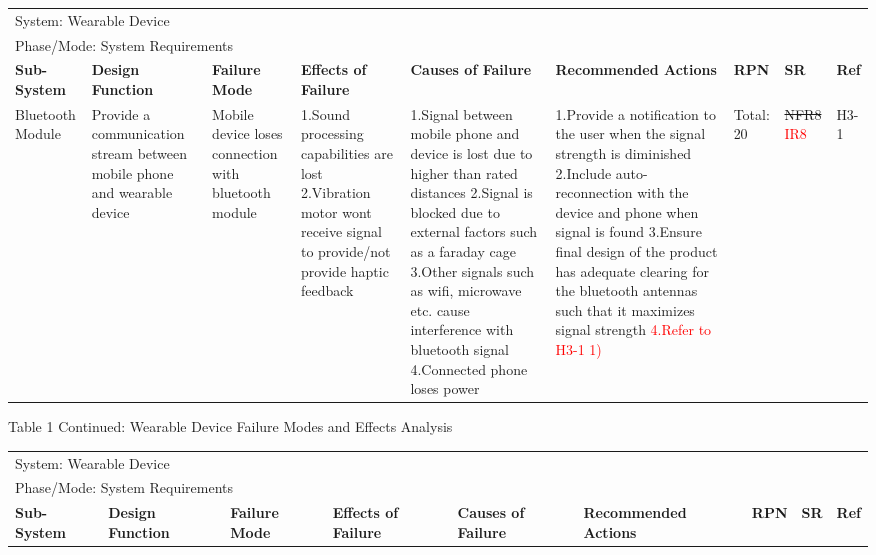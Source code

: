 \documentclass[12pt, titlepage]{article}
\begin{document}
\begin{landscape}
\begin{table}[H]
\begin{tabular}{| p{} | p{}  | p{} | p{} | p{} | p{} | p{} | p{} | p{} |}
        \multicolumn{9}{|l|}{System: Wearable Device} \\
        \multicolumn{9}{|l|}{Phase/Mode: System Requirements} \\ \hline
        \textbf{Sub-System} & \textbf{Design Function} & \textbf{Failure Mode} & \textbf{Effects of Failure} & \textbf{Causes of Failure} & \textbf{Recommended Actions} & \textbf{RPN} & \textbf{SR} & \textbf{Ref} \\ \hline
    
         Bluetooth Module & Provide a communication stream between mobile phone and wearable device & Mobile device loses connection with  bluetooth module & 1.Sound processing capabilities are lost \newline 2.Vibration motor wont receive signal to provide/not provide haptic feedback  & 1.Signal between mobile phone and  device is lost due to higher than rated distances \newline 2.Signal is blocked due to external factors such as a faraday cage \newline 3.Other signals such as wifi, microwave etc. cause interference with bluetooth signal \newline 4.Connected phone loses power  & 1.Provide a notification to the user when the signal strength is diminished \newline 2.Include auto-reconnection with the device and phone when signal is found \newline 3.Ensure final design of the product has adequate clearing for the bluetooth antennas such that it maximizes signal strength \newline \textcolor{red}{4.Refer to H3-1 1)}  &  Total: 20 & \sout{NFR8} \textcolor{red}{IR8} & H3-1 \\ \cline{1-9}
        
        \end{tabular}

\end{table}

\begin{table}[H]
    \centering
        Table 1 Continued: Wearable Device Failure Modes and Effects Analysis

        \begin{tabular}{| p{} | p{}  | p{} | p{} | p{} | p{} | p{} | p{} | p{} |}
            \hline
        
        \multicolumn{9}{|l|}{System: Wearable Device} \\
        \multicolumn{9}{|l|}{Phase/Mode: System Requirements} \\ \hline
        \textbf{Sub-System} & \textbf{Design Function} & \textbf{Failure Mode} & \textbf{Effects of Failure} & \textbf{Causes of Failure} & \textbf{Recommended Actions} & \textbf{RPN} & \textbf{SR} & \textbf{Ref} \\ \hline


\end{tabular}
\end{table}
\end{landscape}
\end{document}
